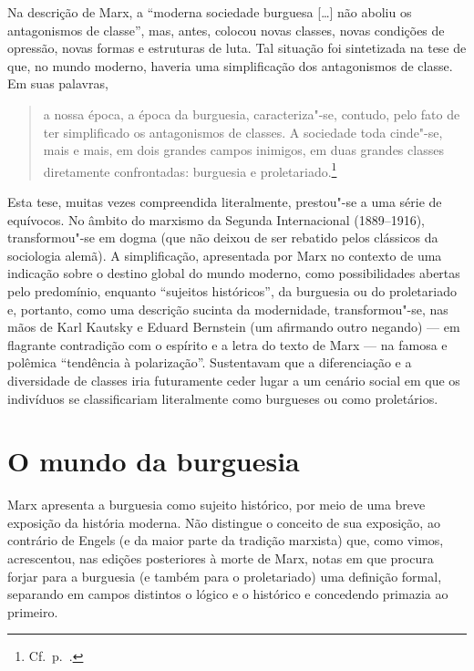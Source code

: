 Na descrição de Marx, a “moderna sociedade burguesa [\ldots{}] não aboliu os
antagonismos de classe”, mas, antes, colocou novas classes, novas
condições de opressão, novas formas e estruturas de luta. Tal situação
foi sintetizada na tese de que, no mundo moderno, haveria uma
simplificação dos antagonismos de classe. Em suas palavras, 

\begin{quote} 
a nossa época, a época da burguesia, caracteriza"-se, contudo, pelo
fato de ter simplificado os antagonismos de classes. A sociedade toda
cinde"-se, mais e mais, em dois grandes campos inimigos, em duas
grandes classes diretamente confrontadas: burguesia e proletariado.\footnote{ Cf.~p.~\pageref{1}.}
\end{quote} 

Esta tese, muitas vezes compreendida literalmente, prestou"-se a uma
série de equívocos. No âmbito do marxismo da Segunda Internacional (1889--1916),
transformou"-se em dogma (que não deixou de ser rebatido pelos
clássicos da sociologia alemã). A simplificação, apresentada por Marx
no contexto de uma indicação sobre o destino global do mundo moderno,
como possibilidades abertas pelo predomínio, enquanto “sujeitos
históricos”, da burguesia ou do proletariado e, portanto, como uma
descrição sucinta da modernidade, transformou"-se, nas mãos de Karl
Kautsky e Eduard Bernstein (um afirmando outro negando) --- em flagrante
contradição com o espírito e a letra do texto de Marx --- na famosa e
polêmica “tendência à polarização”. Sustentavam que a diferenciação e a
diversidade de classes iria futuramente ceder lugar a um cenário social
em que os indivíduos se classificariam literalmente como burgueses
ou como proletários.

\section*{O mundo da burguesia}

Marx apresenta a burguesia como sujeito histórico, por meio de uma breve
exposição da história moderna. Não distingue o conceito de sua
exposição, ao contrário de Engels (e da maior parte da tradição
marxista) que, como vimos, acrescentou, nas edições posteriores à morte
de Marx, notas em que procura forjar para a burguesia (e também para o
proletariado) uma definição formal, separando em campos distintos o
lógico e o histórico e concedendo primazia ao primeiro.


